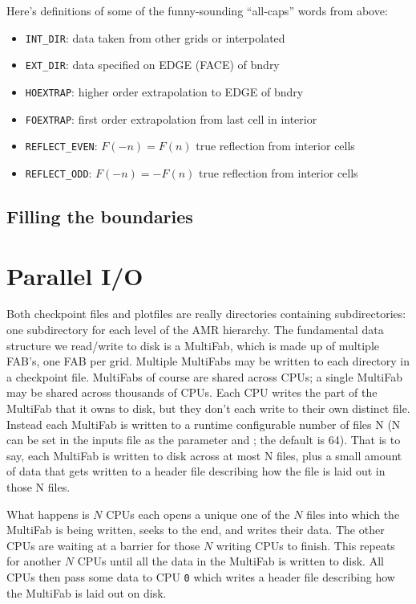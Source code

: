 Here's definitions of some of the funny-sounding ``all-caps''
words from above:
\begin{itemize}
\item {\tt INT\_DIR}: data taken from other grids or interpolated

\item {\tt EXT\_DIR}: data specified on EDGE (FACE) of bndry

\item {\tt HOEXTRAP}: higher order extrapolation to EDGE of bndry

\item {\tt FOEXTRAP}: first order extrapolation from last cell in interior

\item {\tt REFLECT\_EVEN}: $F(-n) = F(n)$ true reflection from interior cells

\item {\tt REFLECT\_ODD}: $F(-n) = -F(n)$ true reflection from interior cells
\end{itemize}


\subsection{Filling the boundaries}


\section{Parallel I/O}

Both checkpoint files and plotfiles are really directories containing
subdirectories: one subdirectory for each level of the AMR hierarchy.
The fundamental data structure we read/write to disk is a MultiFab,
which is made up of multiple FAB's, one FAB per grid.  Multiple
MultiFabs may be written to each directory in a checkpoint file.
MultiFabs of course are shared across CPUs; a single MultiFab may be
shared across thousands of CPUs.  Each CPU writes the part of the
MultiFab that it owns to disk, but they don't each write to their own
distinct file.  Instead each MultiFab is written to a runtime
configurable number of files N (N can be set in the inputs file as the
parameter  and ; the
default is 64).  That is to say, each MultiFab is written to disk
across at most N files, plus a small amount of data that gets written
to a header file describing how the file is laid out in those N files.

What happens is $N$ CPUs each opens a unique one of the $N$ files into
which the MultiFab is being written, seeks to the end, and writes
their data.  The other CPUs are waiting at a barrier for those $N$
writing CPUs to finish.  This repeats for another $N$ CPUs until all the
data in the MultiFab is written to disk.  All CPUs then pass some data
to CPU {\tt 0} which writes a header file describing how the MultiFab is
laid out on disk.

